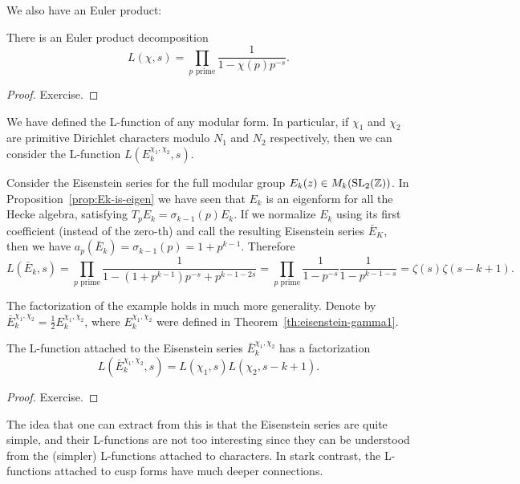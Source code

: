 We also have an Euler product:
\begin{proposition}
  There is an Euler product decomposition
\[
L(\chi,s)=\prod_{p\text{ prime}} \frac{1}{1-\chi(p)p^{-s}}.
\]
\end{proposition}
\begin{proof}
  Exercise.
\end{proof}

We have defined the L-function of any modular form. In particular, if $\chi_1$ and $\chi_2$ are primitive Dirichlet characters modulo $N_1$ and $N_2$ respectively, then we can consider the L-function $L(E_k^{\chi_1,\chi_2},s)$.
\begin{example}
  Consider the Eisenstein series for the full modular group $E_k(z)\in M_k(\operatorname{SL}_2(\mathbb{Z}))$. In Proposition~\ref{prop:Ek-is-eigen} we have seen that $E_k$ is an eigenform for all the Hecke algebra, satisfying $T_p E_k = \sigma_{k-1}(p) E_k$. If we normalize $E_k$ using its first coefficient (instead of the zero-th) and call the resulting Eisenstein series $\bar E_K$, then we have $a_p(\bar E_k) = \sigma_{k-1}(p) = 1+p^{k-1}$. Therefore
\[
L(\bar E_k,s) = \prod_{p\text{ prime}}\frac{1}{1-(1+p^{k-1})p^{-s}+p^{k-1-2s}}=\prod_{p\text{ prime}}\frac{1}{1-p^{-s}}\frac{1}{1-p^{k-1-s}}=\zeta(s)\zeta(s-k+1).
\]
\end{example}
The factorization of the example holds in much more generality. Denote by $\bar E_k^{\chi_1,\chi_2}=\frac{1}{2} E_k^{\chi_1,\chi_2}$, where $E_k^{\chi_1,\chi_2}$ were defined in Theorem~\ref{th:eisenstein-gamma1}.
\begin{proposition}
  The L-function attached to the Eisenstein series $\bar E_k^{\chi_1,\chi_2}$ has a factorization
\[
L(\bar E_k^{\chi_1,\chi_2},s)=L(\chi_1,s)L(\chi_2,s-k+1).
\]
\end{proposition}
\begin{proof}
  Exercise.
\end{proof}
The idea that one can extract from this is that the Eisenstein series are quite simple, and their L-functions are not too interesting since they can be understood from the (simpler) L-functions attached to characters. In stark contrast, the L-functions attached to cusp forms have much deeper connections.

